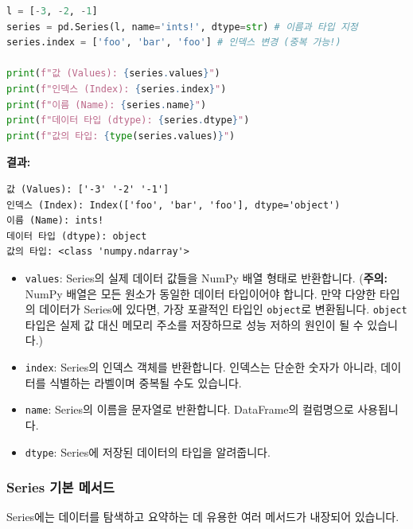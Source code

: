 \documentclass[11pt,a4paper]{book}
\theoremstyle{definition}
\begin{document}
\begin{codeexamplebox}
\begin{lstlisting}[language=Python, caption={Series 속성 확인}, label={lst:series_attributes}, breaklines=true]
l = [-3, -2, -1]
series = pd.Series(l, name='ints!', dtype=str) # 이름과 타입 지정
series.index = ['foo', 'bar', 'foo'] # 인덱스 변경 (중복 가능!)

print(f"값 (Values): {series.values}")
print(f"인덱스 (Index): {series.index}")
print(f"이름 (Name): {series.name}")
print(f"데이터 타입 (dtype): {series.dtype}")
print(f"값의 타입: {type(series.values)}")
\end{lstlisting}
\textbf{결과:}
\begin{verbatim}
값 (Values): ['-3' '-2' '-1']
인덱스 (Index): Index(['foo', 'bar', 'foo'], dtype='object')
이름 (Name): ints!
데이터 타입 (dtype): object
값의 타입: <class 'numpy.ndarray'>
\end{verbatim}
\end{codeexamplebox}
\begin{itemize}
    \item \texttt{values}: Series의 실제 데이터 값들을 NumPy 배열 형태로 반환합니다. (\textbf{주의:} NumPy 배열은 모든 원소가 동일한 데이터 타입이어야 합니다. 만약 다양한 타입의 데이터가 Series에 있다면, 가장 포괄적인 타입인 \texttt{object}로 변환됩니다. \texttt{object} 타입은 실제 값 대신 메모리 주소를 저장하므로 성능 저하의 원인이 될 수 있습니다.)
    \item \texttt{index}: Series의 인덱스 객체를 반환합니다. 인덱스는 단순한 숫자가 아니라, 데이터를 식별하는 라벨이며 중복될 수도 있습니다.
    \item \texttt{name}: Series의 이름을 문자열로 반환합니다. DataFrame의 컬럼명으로 사용됩니다.
    \item \texttt{dtype}: Series에 저장된 데이터의 타입을 알려줍니다.
\end{itemize}

\subsubsection{Series 기본 메서드}

Series에는 데이터를 탐색하고 요약하는 데 유용한 여러 메서드가 내장되어 있습니다.
\end{document}
